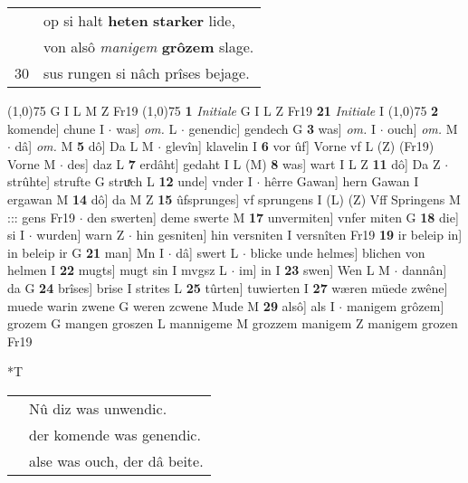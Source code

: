 \documentclass[8pt,a4paper,notitlepage]{article}
\begin{document}
\begin{table}[ht]
\begin{minipage}[t]{0.5\linewidth}
\begin{tabular}{rl}
 & op si halt \textbf{heten} \textbf{starker} lide,\\ 
 & von alsô \textit{manigem} \textbf{grôzem} slage.\\ 
30 & sus rungen si nâch prîses bejage.\\ 
\end{tabular}
\scriptsize
\line(1,0){75} \newline
G I L M Z Fr19 \newline
\line(1,0){75} \newline
\textbf{1} \textit{Initiale} G I L Z Fr19  \textbf{21} \textit{Initiale} I  \newline
\line(1,0){75} \newline
\textbf{2} komende] chune I  $\cdot$ was] \textit{om.} L  $\cdot$ genendic] gendech G \textbf{3} was] \textit{om.} I  $\cdot$ ouch] \textit{om.} M  $\cdot$ dâ] \textit{om.} M \textbf{5} dô] Da L M  $\cdot$ glevîn] klavelin I \textbf{6} vor ûf] Vorne vf L (Z) (Fr19) Vorne M  $\cdot$ des] daz L \textbf{7} erdâht] gedaht I L (M) \textbf{8} was] wart I L Z \textbf{11} dô] Da Z  $\cdot$ strûhte] strufte G struͯch L \textbf{12} unde] vnder I  $\cdot$ hêrre Gawan] hern Gawan I ergawan M \textbf{14} dô] da M Z \textbf{15} ûfsprunges] vf sprungens I (L) (Z) Vff Springens M ::: gens Fr19  $\cdot$ den swerten] deme swerte M \textbf{17} unvermiten] vnfer miten G \textbf{18} die] si I  $\cdot$ wurden] warn Z  $\cdot$ hin gesniten] hin versniten I versnîten Fr19 \textbf{19} ir beleip in] in beleip ir G \textbf{21} man] Mn I  $\cdot$ dâ] swert L  $\cdot$ blicke unde helmes] blichen von helmen I \textbf{22} mugts] mugt sin I mvgsz L  $\cdot$ im] in I \textbf{23} swen] Wen L M  $\cdot$ dannân] da G \textbf{24} brîses] brise I strites L \textbf{25} tûrten] tuwierten I \textbf{27} wæren müede zwêne] muede warin zwene G weren zcwene Mude M \textbf{29} alsô] als I  $\cdot$ manigem grôzem] grozem G mangen groszen L mannigeme M grozzem manigem Z manigem grozen Fr19 \newline
\end{minipage}
\hspace{0.5cm}
\begin{minipage}[t]{0.5\linewidth}
\small
\begin{center}*T
\end{center}
\begin{tabular}{rl}
 & Nû diz was unwendic.\\ 
 & der komende was genendic.\\ 
 & alse was ouch, der dâ beite.\\ 

\end{tabular}
\end{minipage}
\end{table}
\end{document}
